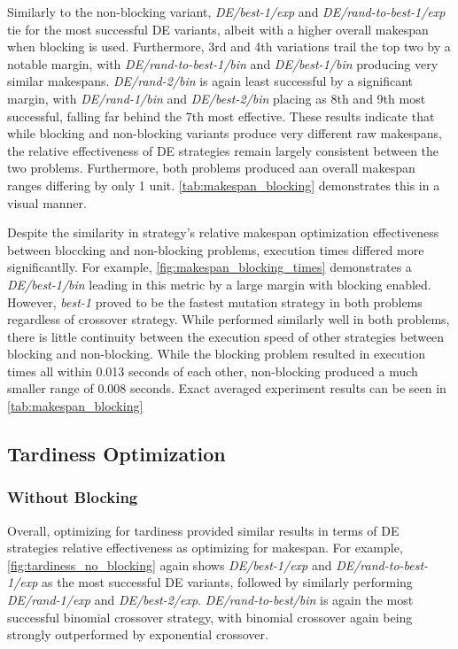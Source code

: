 \documentclass{article}
\begin{document}
Similarly to the non-blocking variant, \textit{DE/best-1/exp} and \textit{DE/rand-to-best-1/exp} tie for the most successful DE variants, albeit with a higher overall makespan when blocking is used. Furthermore, 3rd and 4th variations trail the top two by a notable margin, with \textit{DE/rand-to-best-1/bin} and \textit{DE/best-1/bin} producing very similar makespans. \textit{DE/rand-2/bin} is again least successful by a significant margin, with \textit{DE/rand-1/bin} and \textit{DE/best-2/bin} placing as 8th and 9th most successful, falling far behind the 7th most effective. These results indicate that while blocking and non-blocking variants produce very different raw makespans, the relative effectiveness of DE strategies remain largely consistent between the two problems. Furthermore, both problems produced aan overall makespan ranges differing by only 1 unit. \cref{tab:makespan_blocking} demonstrates this in a visual manner.



Despite the similarity in strategy's relative makespan optimization effectiveness between bloccking and non-blocking problems, execution times differed more significantlly. For example, \cref{fig:makespan_blocking_times} demonstrates a \textit{DE/best-1/bin} leading in this metric by a large margin with blocking enabled. However, \textit{best-1} proved to be the fastest mutation strategy in both problems regardless of crossover strategy. While  performed similarly well in both problems, there is little continuity between the execution speed of other strategies between blocking and non-blocking. While the blocking problem resulted in execution times all within 0.013 seconds of each other, non-blocking produced a much smaller range of 0.008 seconds. Exact averaged experiment results can be seen in \cref{tab:makespan_blocking}





\subsection{Tardiness Optimization}
\subsubsection{Without Blocking}


Overall, optimizing for tardiness provided similar results in terms of DE strategies relative effectiveness as optimizing for makespan. For example, \cref{fig:tardiness_no_blocking} again shows \textit{DE/best-1/exp} and \textit{DE/rand-to-best-1/exp} as the most successful DE variants, followed by similarly performing \textit{DE/rand-1/exp} and \textit{DE/best-2/exp}. \textit{DE/rand-to-best/bin} is again the most successful binomial crossover strategy, with binomial crossover again being strongly outperformed by exponential crossover. 
\end{document}
